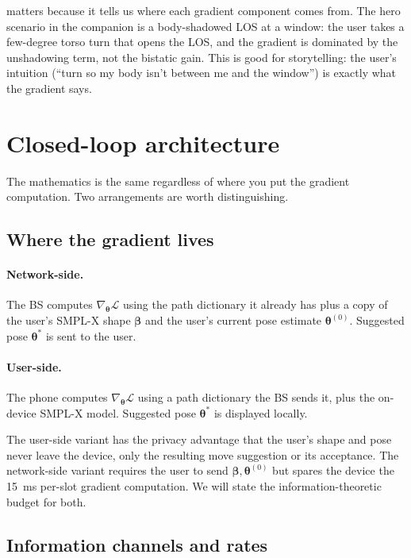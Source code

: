 \documentclass[11pt,a4paper]{article}
\theoremstyle{definition}
\newcommand{\thetab}{\bm{\theta}}
\newcommand{\betab}{\bm{\beta}}
\begin{document}
 matters because it tells us where each gradient
component comes from.  The hero scenario in the companion is a
body-shadowed LOS at a window: the user takes a few-degree torso
turn that opens the LOS, and the gradient is dominated by the
unshadowing term, not the bistatic gain.  This is good for
storytelling: the user's intuition (``turn so my body isn't between
me and the window'') is exactly what the gradient says.

\section{Closed-loop architecture}\label{sec:loop}

The mathematics is the same regardless of where you put the gradient
computation.  Two arrangements are worth distinguishing.

\subsection{Where the gradient lives}

\paragraph{Network-side.}  The BS computes
$\nabla_\thetab\mathcal{L}$ using the path dictionary it already has
plus a copy of the user's SMPL-X shape $\betab$ and the user's
current pose estimate $\thetab^{(0)}$.  Suggested pose $\thetab^*$ is
sent to the user.

\paragraph{User-side.}  The phone computes
$\nabla_\thetab\mathcal{L}$ using a path dictionary the BS sends it,
plus the on-device SMPL-X model.  Suggested pose $\thetab^*$ is
displayed locally.

The user-side variant has the privacy advantage that the user's
shape and pose never leave the device, only the resulting move
suggestion or its acceptance.  The network-side variant requires
the user to send $\betab,\thetab^{(0)}$ but spares the device the
\SI{15}{ms} per-slot gradient computation.  We will state the
information-theoretic budget for both.

\subsection{Information channels and rates}
\end{document}
